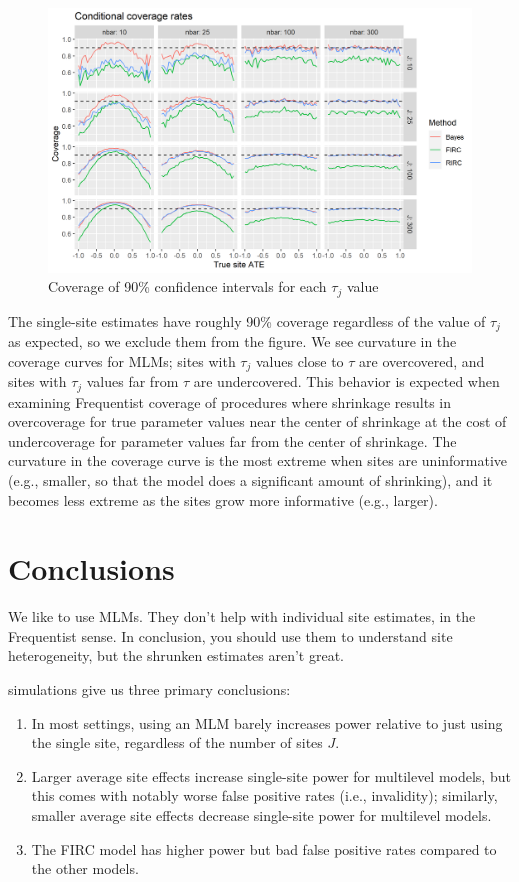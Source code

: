 \documentclass[]{article}
\begin{document}
\begin{figure}[ht]
	\centering
	\includegraphics[width=\textwidth]{coverage_plot}
	\caption{Coverage of 90\% confidence intervals for each $\tau_j$ value}
	\label{fig:coverage_plot}
\end{figure}

The single-site estimates have roughly 90\% coverage regardless of the value of $\tau_j$ as expected, so we exclude them from the figure.
We see curvature in the coverage curves for MLMs; sites with $\tau_j$ values close to $\tau$ are overcovered, and sites with $\tau_j$ values far from $\tau$ are undercovered.
This behavior is expected when examining Frequentist coverage of procedures where shrinkage results in overcoverage for true parameter values near the center of shrinkage at the cost of undercoverage for parameter values far from the center of shrinkage.
The curvature in the coverage curve is the most extreme when sites are uninformative (e.g., smaller, so that the model does a significant amount of shrinking), and it becomes less extreme as the sites grow more informative (e.g., larger).

\section{Conclusions}

We like to use MLMs.
They don't help with individual site estimates, in the Frequentist sense.
In conclusion, you should use them to understand site heterogeneity, but the shrunken estimates aren't great.

simulations give us three primary conclusions:
\begin{enumerate}
	\item In most settings, using an MLM barely increases power relative to just using the single site, regardless of the number of sites $J$.
	\item Larger average site effects increase single-site power for multilevel models, but this comes with notably worse false positive rates (i.e., invalidity); similarly, smaller average site effects decrease single-site power for multilevel models.
	\item The FIRC model has higher power but bad false positive rates compared to the other models.
\end{enumerate}
\end{document}
